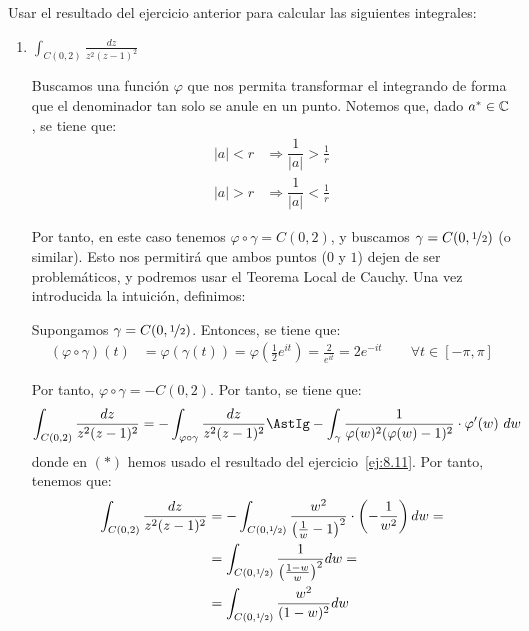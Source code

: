 \begin{ejercicio}
    Usar el resultado del ejercicio anterior para calcular las siguientes integrales:
    \begin{enumerate}
        \item $\displaystyle\int_{C(0,2)} \frac{dz}{z^2(z-1)^2}$
        
        Buscamos una función $\varphi$ que nos permita transformar el integrando de forma que el denominador tan solo se anule en un punto. Notemos que, dado $a^*\in \mathbb{C}$, se tiene que:
        \begin{align*}
            |a|<r&\Longrightarrow \dfrac{1}{|a|}>\frac{1}{r}\\
            |a|>r&\Longrightarrow \dfrac{1}{|a|}<\frac{1}{r}
        \end{align*}

        Por tanto, en este caso tenemos $\varphi\circ \gamma=C(0,2)$, y buscamos $\gamma=C(0,\nicefrac{1}{2})$ (o similar). Esto nos permitirá que ambos puntos ($0$ y $1$) dejen de ser problemáticos, y podremos usar el Teorema Local de Cauchy. Una vez introducida la intuición, definimos:

        Supongamos $\gamma=C(0,\nicefrac{1}{2})$. Entonces, se tiene que:
        \begin{align*}
            (\varphi\circ\gamma)(t) &= \varphi\left(\gamma(t)\right) = \varphi\left(\frac{1}{2}e^{it}\right) = \frac{2}{e^{it}} = 2e^{-it}\qquad \forall t\in [-\pi,\pi]
        \end{align*}

        Por tanto, $\varphi\circ\gamma=-C(0,2)$. Por tanto, se tiene que:
        \begin{align*}
            \int_{C(0,2)} \frac{dz}{z^2(z-1)^2} &= -\int_{\varphi\circ\gamma}\frac{dz}{z^2(z-1)^2} \AstIg -\int_{\gamma}\frac{1}{\varphi(w)^2(\varphi(w)-1)^2} \cdot \varphi'(w)\ dw
        \end{align*}
        donde en $(\ast)$ hemos usado el resultado del ejercicio~\ref{ej:8.11}. Por tanto, tenemos que:
        \begin{align*}
            \int_{C(0,2)} \frac{dz}{z^2(z-1)^2} &= -\int_{C(0,\nicefrac{1}{2})}\frac{w^2}{\left(\frac{1}{w}-1\right)^2} \cdot \left(-\frac{1}{w^2}\right) dw
            =\\&= \int_{C(0,\nicefrac{1}{2})}\frac{1}{\left(\frac{1-w}{w}\right)^2} dw
            =\\&= \int_{C(0,\nicefrac{1}{2})}\frac{w^2}{(1-w)^2} dw
        \end{align*}


\end{enumerate}
\end{ejercicio}
